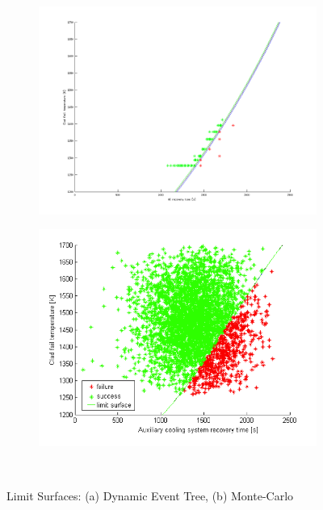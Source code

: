 \begin{figure}
        \centering %
        ~ %
        \begin{subfigure}[b]{0.48\textwidth}
                \centering
                \includegraphics[width=\textwidth]{figures/limitSurface.png}
                \caption{}
                \label{fig:DET_LS}
        \end{subfigure}
        \begin{subfigure}[b]{0.48\textwidth}
                \centering
                \includegraphics[width=\textwidth]{figures/MClimitSurface.png}
                \caption{}
                \label{fig:MonteCarloLS}
        \end{subfigure}
        ~ %
        \caption{Limit Surfaces: (a) Dynamic Event Tree, (b) Monte-Carlo}\label{fig:LimitSurfaces}
\end{figure}

